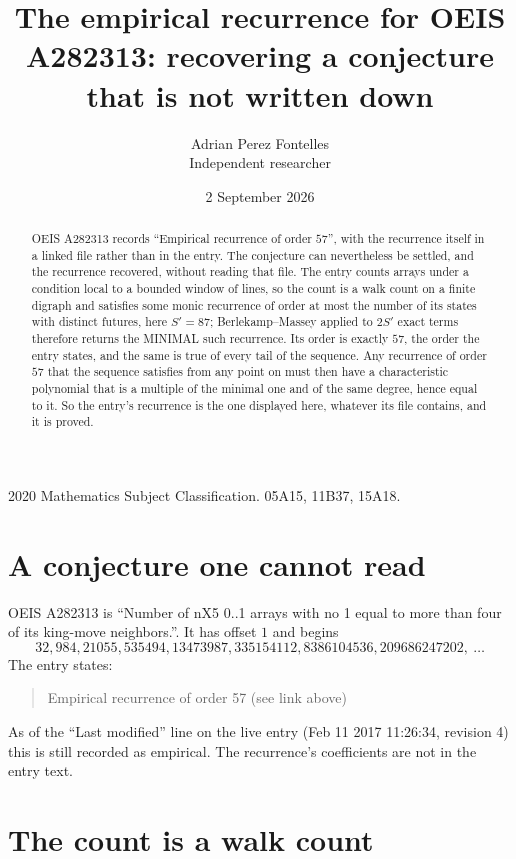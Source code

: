 \documentclass[11pt,a4paper]{article}
\title{The empirical recurrence for OEIS A282313: recovering a conjecture that is not written down}
\author{Adrian Perez Fontelles\\ \small Independent researcher}
\date{2 September 2026}
\theoremstyle{plain}
\theoremstyle{definition}
\begin{document}
\maketitle

\begin{abstract}
OEIS A282313 records ``Empirical recurrence of order $57$'', with the recurrence itself in a
linked file rather than in the entry. The conjecture can nevertheless be settled, and the
recurrence recovered, without reading that file. The entry counts arrays under a condition
local to a bounded window of lines, so the count is a walk count on a finite digraph and
satisfies some monic recurrence of order at most the number of its states with distinct
futures, here $S'=87$; Berlekamp--Massey applied to $2S'$ exact
terms therefore returns the MINIMAL such recurrence. Its order is exactly $57$, the order
the entry states, and the same is true of every tail of the sequence. Any recurrence of order
$57$ that the sequence satisfies from any point on must then have a characteristic
polynomial that is a multiple of the minimal one and of the same degree, hence equal to it. So
the entry's recurrence is the one displayed here, whatever its file contains, and it is
proved.
\end{abstract}

\noindent\small 2020 Mathematics Subject Classification. 05A15, 11B37, 15A18.\normalsize

\section{A conjecture one cannot read}

OEIS A282313 is ``Number of nX5 0..1 arrays with no 1 equal to more than four of its king-move neighbors.''. It has offset $1$ and begins
\[
32, 984, 21055, 535494, 13473987, 335154112, 8386104536, 209686247202,\ \dots
\]
The entry states:
\begin{quote}
Empirical recurrence of order 57 (see link above)
\end{quote}
As of the ``Last modified'' line on the live entry (Feb 11 2017 11:26:34, revision 4) this is still
recorded as empirical. The recurrence's coefficients are not in the entry text.

\section{The count is a walk count}
\end{document}
